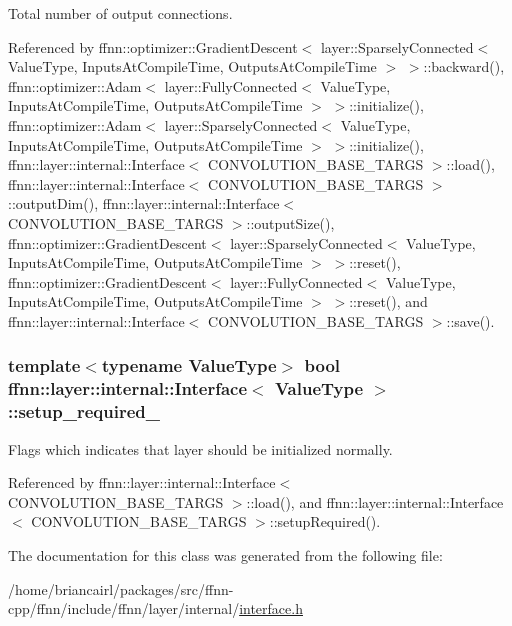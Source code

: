 Total number of output connections. 



Referenced by ffnn\-::optimizer\-::\-Gradient\-Descent$<$ layer\-::\-Sparsely\-Connected$<$ Value\-Type, Inputs\-At\-Compile\-Time, Outputs\-At\-Compile\-Time $>$ $>$\-::backward(), ffnn\-::optimizer\-::\-Adam$<$ layer\-::\-Fully\-Connected$<$ Value\-Type, Inputs\-At\-Compile\-Time, Outputs\-At\-Compile\-Time $>$ $>$\-::initialize(), ffnn\-::optimizer\-::\-Adam$<$ layer\-::\-Sparsely\-Connected$<$ Value\-Type, Inputs\-At\-Compile\-Time, Outputs\-At\-Compile\-Time $>$ $>$\-::initialize(), ffnn\-::layer\-::internal\-::\-Interface$<$ C\-O\-N\-V\-O\-L\-U\-T\-I\-O\-N\-\_\-\-B\-A\-S\-E\-\_\-\-T\-A\-R\-G\-S $>$\-::load(), ffnn\-::layer\-::internal\-::\-Interface$<$ C\-O\-N\-V\-O\-L\-U\-T\-I\-O\-N\-\_\-\-B\-A\-S\-E\-\_\-\-T\-A\-R\-G\-S $>$\-::output\-Dim(), ffnn\-::layer\-::internal\-::\-Interface$<$ C\-O\-N\-V\-O\-L\-U\-T\-I\-O\-N\-\_\-\-B\-A\-S\-E\-\_\-\-T\-A\-R\-G\-S $>$\-::output\-Size(), ffnn\-::optimizer\-::\-Gradient\-Descent$<$ layer\-::\-Sparsely\-Connected$<$ Value\-Type, Inputs\-At\-Compile\-Time, Outputs\-At\-Compile\-Time $>$ $>$\-::reset(), ffnn\-::optimizer\-::\-Gradient\-Descent$<$ layer\-::\-Fully\-Connected$<$ Value\-Type, Inputs\-At\-Compile\-Time, Outputs\-At\-Compile\-Time $>$ $>$\-::reset(), and ffnn\-::layer\-::internal\-::\-Interface$<$ C\-O\-N\-V\-O\-L\-U\-T\-I\-O\-N\-\_\-\-B\-A\-S\-E\-\_\-\-T\-A\-R\-G\-S $>$\-::save().

\hypertarget{classffnn_1_1layer_1_1internal_1_1_interface_a57f0de55599c9b6621a66096b5662ca8}{
\subsubsection[{setup\-\_\-required\-\_\-}]{\setlength{\rightskip}{0pt plus 5cm}template$<$typename Value\-Type$>$ bool {\bf ffnn\-::layer\-::internal\-::\-Interface}$<$ Value\-Type $>$\-::setup\-\_\-required\-\_\-\hspace{0.3cm}{\ttfamily [protected]}}}\label{classffnn_1_1layer_1_1internal_1_1_interface_a57f0de55599c9b6621a66096b5662ca8}


Flags which indicates that layer should be initialized normally. 



Referenced by ffnn\-::layer\-::internal\-::\-Interface$<$ C\-O\-N\-V\-O\-L\-U\-T\-I\-O\-N\-\_\-\-B\-A\-S\-E\-\_\-\-T\-A\-R\-G\-S $>$\-::load(), and ffnn\-::layer\-::internal\-::\-Interface$<$ C\-O\-N\-V\-O\-L\-U\-T\-I\-O\-N\-\_\-\-B\-A\-S\-E\-\_\-\-T\-A\-R\-G\-S $>$\-::setup\-Required().



The documentation for this class was generated from the following file\-:\begin{DoxyCompactItemize}
\item 
/home/briancairl/packages/src/ffnn-\/cpp/ffnn/include/ffnn/layer/internal/\hyperlink{interface_8h}{interface.\-h}\end{DoxyCompactItemize}
